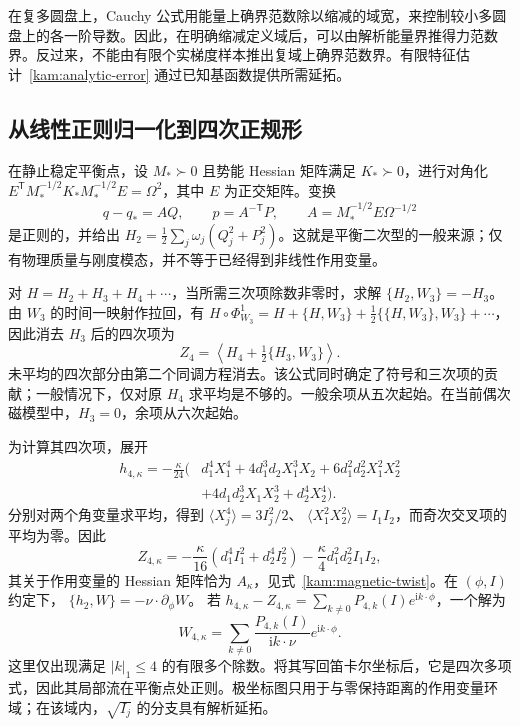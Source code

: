 在复多圆盘上，Cauchy 公式用能量上确界范数除以缩减的域宽，来控制较小多圆盘上的各一阶导数。因此，在明确缩减定义域后，可以由解析能量界推得力范数界。反过来，不能由有限个实梯度样本推出复域上确界范数界。有限特征估计~\eqref{kam:analytic-error} 通过已知基函数提供所需延拓。

\subsection{从线性正则归一化到四次正规形}
\label{ss:normalform}

在静止稳定平衡点，设 $M_*\succ0$ 且势能 Hessian 矩阵满足 $K_*\succ0$，进行对角化
$E^{\mathsf T}M_*^{-1/2}K_*M_*^{-1/2}E=\Omega^2$，其中 $E$ 为正交矩阵。变换
\[
 q-q_*=A Q,\qquad p=A^{-\mathsf T}P,
 \qquad A=M_*^{-1/2}E\Omega^{-1/2}
\]
是正则的，并给出 $H_2=\tfrac12\sum_j\omega_j(Q_j^2+P_j^2)$。这就是平衡二次型的一般来源；仅有物理质量与刚度模态，并不等于已经得到非线性作用变量。

对 $H=H_2+H_3+H_4+\cdots$，当所需三次项除数非零时，求解
$\{H_2,W_3\}=-H_3$。由 $W_3$ 的时间一映射作拉回，有
$H\circ\Phi_{W_3}^1=H+\{H,W_3\}+\tfrac12\{\{H,W_3\},W_3\}+\cdots$，
因此消去 $H_3$ 后的四次项为
\begin{equation}\label{ss:cubic-correction}
 Z_4=\left\langle H_4+\tfrac12\{H_3,W_3\}\right\rangle.
\end{equation}
未平均的四次部分由第二个同调方程消去。该公式同时确定了符号和三次项的贡献；一般情况下，仅对原 $H_4$ 求平均是不够的。一般余项从五次起始。在当前偶次磁模型中，$H_3=0$，余项从六次起始。

为计算其四次项，展开
\begin{equation}\label{ss:quartic-polynomial}
\begin{aligned}
 h_{4,\kappa}=-\frac{\kappa}{24}\bigl(&d_1^4X_1^4
    +4d_1^3d_2X_1^3X_2+6d_1^2d_2^2X_1^2X_2^2\\
    &+4d_1d_2^3X_1X_2^3+d_2^4X_2^4\bigr).
\end{aligned}
\end{equation}
分别对两个角变量求平均，得到
$\langle X_j^4\rangle=3I_j^2/2$、
$\langle X_1^2X_2^2\rangle=I_1I_2$，而奇次交叉项的平均为零。因此
\[
 Z_{4,\kappa}=-\frac{\kappa}{16}
       (d_1^4I_1^2+d_2^4I_2^2)
       -\frac{\kappa}{4}d_1^2d_2^2I_1I_2,
\]
其关于作用变量的 Hessian 矩阵恰为 $A_\kappa$，见式~\eqref{kam:magnetic-twist}。在 $(\phi,I)$ 约定下，
$\{h_2,W\}=-\nu\cdot\partial_\phi W$。
若 $h_{4,\kappa}-Z_{4,\kappa}=\sum_{k\ne0}P_{4,k}(I)e^{\mathrm i k\cdot\phi}$，一个解为
\begin{equation}\label{ss:quartic-generator}
 W_{4,\kappa}=
 \sum_{k\ne0}\frac{P_{4,k}(I)}{\mathrm i k\cdot\nu}
                 e^{\mathrm i k\cdot\phi}.
\end{equation}
这里仅出现满足 $|k|_1\le4$ 的有限多个除数。将其写回笛卡尔坐标后，它是四次多项式，因此其局部流在平衡点处正则。极坐标图只用于与零保持距离的作用变量环域；在该域内，$\sqrt{I_j}$ 的分支具有解析延拓。

